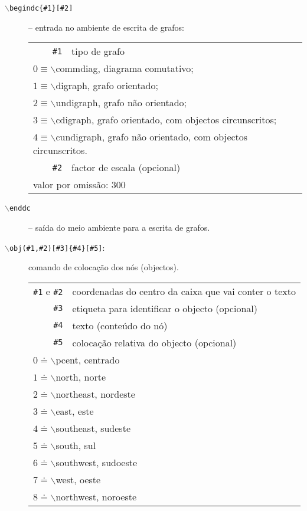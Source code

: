 \documentclass[a4paper,11pt]{article}
\begin{document}
\begin{description}
\item[\tt $\backslash$begindc\{\#1\}[\#2\mbox{]}] -- entrada no ambiente de
  escrita de grafos:

  \begin{tabular}{r@{ -- }l}
    {\tt \#1} & tipo de grafo\\
    \multicolumn{2}{l}{\quad $0\equiv\backslash$commdiag, diagrama comutativo;}\\
    \multicolumn{2}{l}{\quad $1\equiv\backslash$digraph, grafo orientado;}\\
    \multicolumn{2}{l}{\quad $2\equiv\backslash$undigraph, grafo não orientado;}\\
    \multicolumn{2}{l}{\quad $3\equiv\backslash$cdigraph, grafo orientado, com
      objectos circunscritos;}\\
    \multicolumn{2}{l}{\quad $4\equiv\backslash$cundigraph, grafo não orientado,
      com objectos circunscritos.}\\
    {\tt \#2} & factor de escala (opcional)\\
    \multicolumn{2}{l}{\quad valor por omissão: 300}
  \end{tabular}
  
\item[\tt $\backslash$enddc] -- saída do meio ambiente para a
  escrita de grafos.  

\item[{\tt $\backslash$obj(\#1,\#2)[\#3]\{\#4\}[\#5]}:] comando de colocação
  dos nós (objectos).  

  \begin{tabular}{r@{ -- }l}
    {\tt \#1} e  {\tt \#2}& coordenadas do centro da caixa que vai
    conter o texto\\
    {\tt \#3} & etiqueta para identificar o objecto (opcional)\\
    {\tt \#4} & texto (conte{\'u}do do nó)\\
    {\tt \#5} & colocação relativa do objecto (opcional)\\
    \multicolumn{2}{l}{\qquad\quad $0\doteq\backslash$pcent, centrado}\\
    \multicolumn{2}{l}{\qquad\quad $1\doteq\backslash$north, norte}\\
    \multicolumn{2}{l}{\qquad\quad $2\doteq\backslash$northeast, nordeste}\\
    \multicolumn{2}{l}{\qquad\quad $3\doteq\backslash$east, este}\\
    \multicolumn{2}{l}{\qquad\quad $4\doteq\backslash$southeast, sudeste}\\
    \multicolumn{2}{l}{\qquad\quad $5\doteq\backslash$south, sul}\\
    \multicolumn{2}{l}{\qquad\quad $6\doteq\backslash$southwest, sudoeste}\\
    \multicolumn{2}{l}{\qquad\quad $7\doteq\backslash$west, oeste}\\
    \multicolumn{2}{l}{\qquad\quad $8\doteq\backslash$northwest, noroeste}
  \end{tabular}


\end{description}
\end{document}
